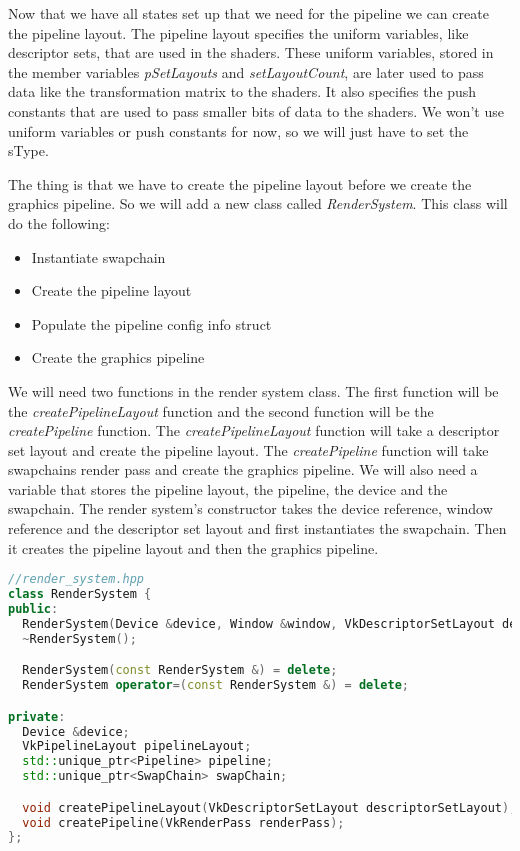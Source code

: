 \documentclass[12pt]{report} \usepackage{preamble}
\begin{document}
Now that we have all states set up that we need for the pipeline we can create the pipeline layout. The pipeline layout
specifies the uniform variables, like descriptor sets, that are used in the shaders. These uniform variables, stored in the member variables
\textit{pSetLayouts} and \textit{setLayoutCount}, are later used to pass data like the
transformation matrix to the shaders. It also specifies the push constants that are used to pass smaller bits of data to the
shaders. We won't use uniform variables or push constants for now, so we will just have to set the sType.

The thing is that we have to create the pipeline layout before we create the graphics pipeline. So we will
add a new class called \textit{RenderSystem}. This class will do the following:

\begin{itemize}
	\item Instantiate swapchain
	\item Create the pipeline layout
	\item Populate the pipeline config info struct
	\item Create the graphics pipeline
\end{itemize}

We will need two functions in the render system class. The first function will be the \textit{createPipelineLayout} function
and the second function will be the \textit{createPipeline} function. The \textit{createPipelineLayout} function will take
a descriptor set layout and create the pipeline layout. The \textit{createPipeline} function will take swapchains render pass and
create the graphics pipeline. We will also need a variable that stores the pipeline
layout, the pipeline, the device and the swapchain. The render system's constructor takes the device reference, window reference and
the descriptor set layout and first instantiates the swapchain. Then it creates the pipeline layout and then the graphics pipeline.

\begin{lstlisting}[language=C++]
//render_system.hpp
class RenderSystem {
public:
  RenderSystem(Device &device, Window &window, VkDescriptorSetLayout descriptorSetLayout);
  ~RenderSystem();

  RenderSystem(const RenderSystem &) = delete;
  RenderSystem operator=(const RenderSystem &) = delete;

private:
  Device &device;
  VkPipelineLayout pipelineLayout;
  std::unique_ptr<Pipeline> pipeline;
  std::unique_ptr<SwapChain> swapChain;

  void createPipelineLayout(VkDescriptorSetLayout descriptorSetLayout);
  void createPipeline(VkRenderPass renderPass);
};
\end{lstlisting}
\end{document}
